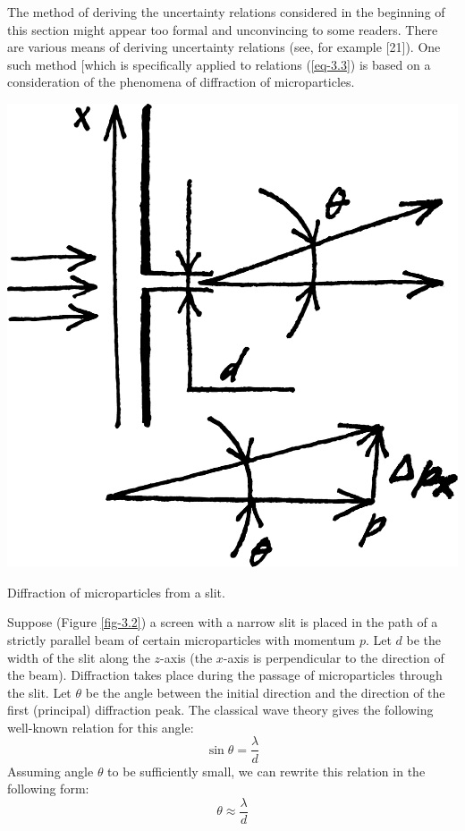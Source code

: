 \documentclass[a4paper,sfsidenotes,colorlinks=true]{tufte-book}
\numberwithin{equation}{section}
\numberwithin{figure}{section}
\begin{document}
The method of deriving the uncertainty relations
considered in the beginning of this section might appear too formal
and unconvincing to some readers. There are various means of deriving
uncertainty relations (see, for example [21]). One such method [which
is specifically applied to relations (\ref{eq-3.3}) is based on a
consideration of the phenomena of diffraction of microparticles.
\begin{marginfigure}%
\centering
\includegraphics[width=\linewidth]{figures/fig-03-02.pdf}
\caption{Diffraction of microparticles from a slit.}
\label{fig-3.2}
\end{marginfigure}

Suppose (Figure \ref{fig-3.2}) a screen with a narrow slit is placed
in the path of a strictly parallel beam of certain microparticles with
momentum $p$. Let $d$ be the width of the slit along the $z$-axis (the
$x$-axis is perpendicular to the direction of the beam). Diffraction
takes place during the passage of microparticles through the slit. Let
$\theta$ be the angle between the initial direction and the direction of the
first (principal) diffraction peak. The classical wave theory gives
the following well-known relation for this angle:
\begin{equation*}%
\sin \theta = \frac{\lambda}{d}
\end{equation*}
Assuming angle $\theta$ to be sufficiently small, we can rewrite this
relation in the following form:
\begin{equation}%
 \theta \approx \frac{\lambda}{d}
\label{eq-3.5}
\end{equation}
\end{document}
